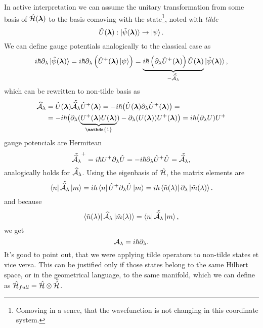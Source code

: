 In active interpretation we can assume the unitary transformation from some basis of $\HH(\llambda)$ to the basis comoving with the state\footnote{Comoving in a sence, that the wavefunction is not changing in this coordinate system.}, noted with \emph{tilde}
$$\U(\llambda): \ket{\tilde\psi(\llambda)} \rightarrow \kpsi.$$
We can define gauge potentials analogically to the classical case as
\begin{equation}
    i\hbar\partial_\lambda \ket{\tilde{\psi}(\llambda)} = i\hbar \partial_\lambda\left(\U^+(\llambda)\ket{\psi} \right)= \underbrace{i\hbar\left(\partial_\lambda \U^+(\llambda)\right)\U(\llambda)}_{-\tilde{\AA_\lambda}}\ket{\tilde{\psi}(\llambda)},
\end{equation}
which can be rewritten to non-tilde basis as
\begin{equation}
    \begin{split}
        \AA_\lambda&=\U(\llambda)\tilde{\AA_\lambda}\U^+(\llambda) = -i\hbar\big(\U(\llambda)\partial_\lambda \U^+(\llambda)\big) =\\
        &= -i\hbar\big(\partial_\lambda(\underbrace{U^+(\llambda)U(\llambda)}_{\mathds{1}})-\partial_\lambda(U(\llambda))U^+(\llambda) \big) =i\hbar \big(\partial_\lambda U)U^+
    \end{split}
\end{equation}
gauge potencials are Hermitean
\begin{equation}
     \tilde{\AA_\lambda}^+=i\hbar U^+\partial_\lambda\U=-i\hbar\partial_\lambda\U^+\U = \tilde{\AA_\lambda} ,
\end{equation}
analogically holds for $\AA_\lambda$. Using the eigenbasis of $\HH$, the matrix elements are
\begin{equation}
    \bra{n}\tilde{\AA_\lambda}\ket{m}=i\hbar\bra{n}\U^+\partial_\lambda\U\ket{m} = i\hbar\bra{\tilde n(\lambda)}\partial_\lambda\ket{\tilde m(\lambda)}.
\end{equation}
and because
\begin{equation}
    \bra{\tilde n(\lambda)}\AA_\lambda\ket{\tilde m(\lambda)}= \bra{n}\tilde{\AA_\lambda}\ket{m},
\end{equation}
we get
\begin{equation}
    \A_\lambda = i\hbar\partial_\lambda.
\end{equation}
It's good to point out, that we were applying tilde operators to non-tilde states et vice versa. This can be justified only if those states belong to the same Hilbert space, or in the geometrical language, to the same manifold, which we can define as $\HH_{full}=\HH\otimes\tilde\HH$.


